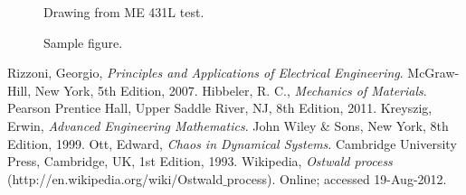 \documentclass{article}
\begin{document}
\begin{figure}[htb]
\begin{center}
\caption{Drawing from ME 431L test.}
\end{center}
\end{figure}

\begin{figure}[htb]
\begin{center}
\caption{Sample figure.}
\end{center}
\end{figure}
\pagebreak

\begin{thebibliography}{9}
  Rizzoni, Georgio,
  {\it Principles and Applications of Electrical Engineering}.
  McGraw-Hill, New York,
  5th Edition,
  2007.
Hibbeler, R. C.,
{\it Mechanics of Materials}.
Pearson Prentice Hall, Upper Saddle River, NJ, 8th Edition, 2011.
Kreyszig, Erwin,
{\it Advanced Engineering Mathematics}.
John Wiley \& Sons, New York, 8th Edition, 1999.
Ott, Edward,
{\it Chaos in Dynamical Systems}.
Cambridge University Press, Cambridge, UK, 1st Edition, 1993.
Wikipedia, 
{\it Ostwald process} (http://en.wikipedia.org/wiki/Ostwald$\_$process).
Online; accessed 19-Aug-2012.
\end{thebibliography}
\end{document}
